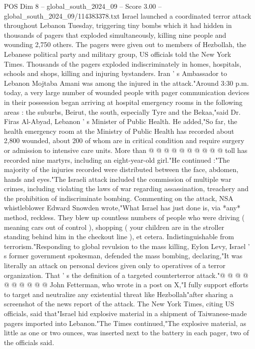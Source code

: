 \begin{textsample}{POS Dim 8 – global\_south\_2024\_09 – Score 3.00 – global\_south\_2024\_09/114383378.txt}  \label{ex:f8_pos_290}
Israel launched a coordinated terror attack throughout Lebanon Tuesday, triggering tiny bombs which it had hidden in thousands of pagers that exploded simultaneously, killing nine people and wounding 2,750 others.
The pagers were given out to members of Hezbollah, the Lebanese political party and military group, US officials told the New York Times.
Thousands of the pagers exploded indiscriminately in homes, hospitals, schools and shops, killing and injuring bystanders.
Iran ' s Ambassador to Lebanon Mojtaba Amani was among the injured in the attack."Around 3:30 p.m. today, a very large number of wounded people with pager communication devices in their possession began arriving at hospital emergency rooms in the following areas : the suburbs, Beirut, the south, especially Tyre and the Bekaa,"said Dr.
Firas Al-Abyad, Lebanon ' s Minister of Public Health.
He added,"So far, the health emergency room at the Ministry of Public Health has recorded about 2,800 wounded, about 200 of whom are in critical condition and require surgery or admission to intensive care units.
More than @ @ @ @ @ @ @ @ @ @ toll has recorded nine martyrs, including an eight-year-old girl."He continued :"The majority of the injuries recorded were distributed between the face, abdomen, hands and eyes."The Israeli attack included the commission of multiple war crimes, including violating the laws of war regarding assassination, treachery and the prohibition of indiscriminate bombing.
Commenting on the attack, NSA whistleblower Edward Snowden wrote,"What Israel has just done is, via *any* method, reckless.
They blew up countless numbers of people who were driving ( meaning cars out of control ), shopping ( your children are in the stroller standing behind him in the checkout line ), et cetera.
Indistinguishable from terrorism."Responding to global revulsion to the mass killing, Eylon Levy, Israel ' s former government spokesman, defended the mass bombing, declaring,"It was literally an attack on personal devices given only to operatives of a terror organization.
That ' s the definition of a targeted counterterror attack."@ @ @ @ @ @ @ @ @ @ John Fetterman, who wrote in a post on X,"I fully support efforts to target and neutralize any existential threat like Hezbollah"after sharing a screenshot of the news report of the attack.
The New York Times, citing US officials, said that"Israel hid explosive material in a shipment of Taiwanese-made pagers imported into Lebanon."The Times continued,"The explosive material, as little as one or two ounces, was inserted next to the battery in each pager, two of the officials said.

\end{textsample}
